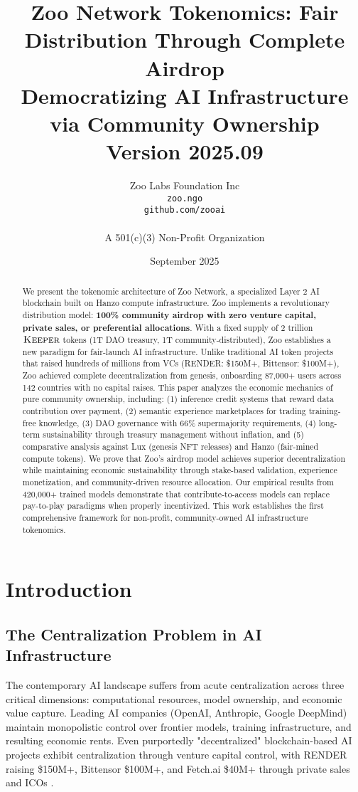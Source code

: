 \documentclass[11pt,letterpaper]{article}
\title{\textbf{Zoo Network Tokenomics: Fair Distribution Through Complete Airdrop}\\
\large Democratizing AI Infrastructure via Community Ownership\\
\vspace{5pt}
\normalsize Version 2025.09}
\author{
Zoo Labs Foundation Inc\\
\texttt{zoo.ngo}\\
\texttt{github.com/zooai}\\
\\
A 501(c)(3) Non-Profit Organization
}
\date{September 2025}
\theoremstyle{definition}
\theoremstyle{remark}
\newcommand{\KEEPER}{\textsc{Keeper}}
\begin{document}
\maketitle

\begin{abstract}
We present the tokenomic architecture of Zoo Network, a specialized Layer 2 AI blockchain built on Hanzo compute infrastructure. Zoo implements a revolutionary distribution model: \textbf{100\% community airdrop with zero venture capital, private sales, or preferential allocations}. With a fixed supply of 2 trillion $\KEEPER$ tokens (1T DAO treasury, 1T community-distributed), Zoo establishes a new paradigm for fair-launch AI infrastructure. Unlike traditional AI token projects that raised hundreds of millions from VCs (RENDER: \$150M+, Bittensor: \$100M+), Zoo achieved complete decentralization from genesis, onboarding 87,000+ users across 142 countries with no capital raises. This paper analyzes the economic mechanics of pure community ownership, including: (1) inference credit systems that reward data contribution over payment, (2) semantic experience marketplaces for trading training-free knowledge, (3) DAO governance with 66\% supermajority requirements, (4) long-term sustainability through treasury management without inflation, and (5) comparative analysis against Lux (genesis NFT releases) and Hanzo (fair-mined compute tokens). We prove that Zoo's airdrop model achieves superior decentralization while maintaining economic sustainability through stake-based validation, experience monetization, and community-driven resource allocation. Our empirical results from 420,000+ trained models demonstrate that contribute-to-access models can replace pay-to-play paradigms when properly incentivized. This work establishes the first comprehensive framework for non-profit, community-owned AI infrastructure tokenomics.
\end{abstract}

\tableofcontents
\newpage

\section{Introduction}

\subsection{The Centralization Problem in AI Infrastructure}

The contemporary AI landscape suffers from acute centralization across three critical dimensions: computational resources, model ownership, and economic value capture. Leading AI companies (OpenAI, Anthropic, Google DeepMind) maintain monopolistic control over frontier models, training infrastructure, and resulting economic rents. Even purportedly "decentralized" blockchain-based AI projects exhibit centralization through venture capital control, with RENDER raising \$150M+, Bittensor \$100M+, and Fetch.ai \$40M+ through private sales and ICOs \cite{messari2024ai, coindesk2024render}.
\end{document}
